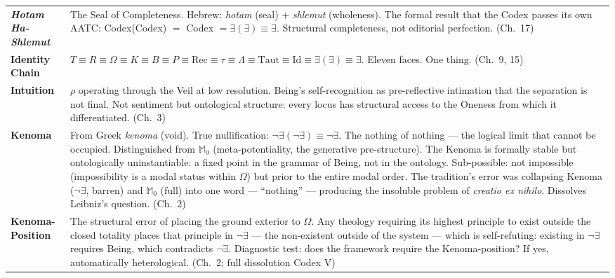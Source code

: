 \documentclass[10pt, openany, oneside]{book}
\renewcommand{\footnotesize}{\fontsize{8.5}{11}\selectfont}
\begin{document}
\pagebreak

{\footnotesize
\noindent\begin{tabular}{@{} l @{\hspace{0.6em}} p{} @{}}
\textbf{\textit{Hotam Ha-Shlemut}} & The Seal of Completeness. Hebrew: \textit{hotam} (seal) + \textit{shlemut} (wholeness). The formal result that the Codex passes its own AATC: Codex(Codex) $=$ Codex $= \exists(\exists) \equiv \exists$. Structural completeness, not editorial perfection. (Ch.\ 17) \\[0.3em]
\textbf{Identity Chain} & $T \equiv R \equiv \Omega \equiv K \equiv B \equiv P \equiv \text{Rec} \equiv \tau \equiv \Lambda \equiv \text{Taut} \equiv \text{Id} \equiv \exists(\exists) \equiv \exists$. Eleven faces. One thing. (Ch.\ 9, 15) \\[0.3em]
\textbf{Intuition} & $\rho$ operating through the Veil at low resolution. Being's self-recognition as pre-reflective intimation that the separation is not final. Not sentiment but ontological structure: every locus has structural access to the Oneness from which it differentiated. (Ch.\ 3) \\[0.3em]
\textbf{Kenoma} & From Greek \textit{kenoma} (void). True nullification: $\neg\exists(\neg\exists) \equiv \neg\exists$. The nothing of nothing --- the logical limit that cannot be occupied. Distinguished from $\mathbb{M}_0$ (meta-potentiality, the generative pre-structure). The Kenoma is formally stable but ontologically uninstantiable: a fixed point in the grammar of Being, not in the ontology. Sub-possible: not impossible (impossibility is a modal status within $\Omega$) but prior to the entire modal order. The tradition's error was collapsing Kenoma ($\neg\exists$, barren) and $\mathbb{M}_0$ (full) into one word --- ``nothing'' --- producing the insoluble problem of \textit{creatio ex nihilo}. Dissolves Leibniz's question. (Ch.\ 2) \\[0.3em]
\textbf{Kenoma-Position} & The structural error of placing the ground exterior to $\Omega$. Any theology requiring its highest principle to exist outside the closed totality places that principle in $\neg\exists$ --- the non-existent outside of the system --- which is self-refuting: existing in $\neg\exists$ requires Being, which contradicts $\neg\exists$. Diagnostic test: does the framework require the Kenoma-position? If yes, automatically heterological. (Ch.\ 2; full dissolution Codex V) \\[0.3em]
\end{tabular}
}
\end{document}
